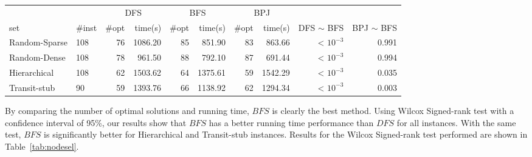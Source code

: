 \documentclass[conference]{IEEEtran}
\begin{document}
\begin{table*}[h]
\begin{center}
  \caption{Node Selection Results}\label{tab:nodesel}
\begin{tabular} {l l | r r | r r | r r | r r }
\hline
                &                &  \multicolumn{2}{c|}{DFS}  & \multicolumn{2}{c|}{BFS}   & \multicolumn{2}{c|}{BPJ}  \\
  set           & \#inst           &  \#opt       & time(s)        & \#opt   & time(s)          & \#opt           & time(s)     & DFS $\sim$ BFS   & BPJ $\sim$ BFS  \\
 \hline 
 Random-Sparse  & 108            & 76         & 1086.20    & 85        & 851.90       & 83            & 863.66   & < $10^{-3}$         & 0.991          \\
 Random-Dense   & 108            & 78         & 961.50     & 88        & 792.10       & 87            & 691.44   & < $10^{-3}$         & 0.994          \\ 
 Hierarchical   & 108            & 62         & 1503.62    & 64        & 1375.61      & 59            & 1542.29  & < $10^{-3}$         & 0.035          \\
 Transit-stub   & 90             & 59         & 1393.76    & 66        & 1138.92      & 62            & 1294.34  & < $10^{-3}$         & 0.003          \\
\hline
\end{tabular}
\end{center}
\end{table*}

By comparing the number of optimal solutions and running time, $BFS$ is clearly the best method.
Using Wilcox Signed-rank test with a confidence interval of 95\%, our results show that $BFS$ has a better running time performance than $DFS$ for all instances.
With the same test, $BFS$ is significantly better for Hierarchical and Transit-stub instances.
Results for the Wilcox Signed-rank test performed are shown in Table~\ref{tab:nodesel}.
\end{document}
